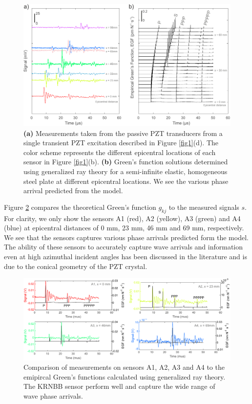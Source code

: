 \documentclass[preprint,3p, 11pt,authoryear]{elsarticle}
\begin{document}
{\begin{figure}[ht]
     	\centering
\includegraphics[scale= 1.0]{FIG3.pdf} 
\caption{\textbf{(a)} Measurements taken from the passive PZT transducers from a single transient PZT excitation described in Figure \ref{fig1}(d). The color scheme represents the different epicentral locations of each sensor in Figure \ref{fig1}(b).  \textbf{(b)} Green's function solutions determined using generalized ray theory for a semi-infinite elastic, homogeneous steel plate at different epicentral locations.  We see the various phase arrival predicted from the model.}
	\label{fig3} 
\end{figure}

Figure \ref{fig4} compares the theoretical Green's function $g_{kj}$ to the measured signals $s$.  For clarity, we only show the sensors A1 (red), A2 (yellow), A3 (green) and A4 (blue) at epicentral distances of 0 mm, 23 mm, 46 mm and 69 mm, respectively. We see that the sensors captures various phase arrivals predicted form the model. The ability of these sensors to accurately capture wave arrivals and information even at high azimuthal incident angles has been discussed in the literature \citep{Goodfellow2015, Selvadurai2019} and is due to the conical geometry of the PZT crystal. 


\begin{figure}[ht]
     	\centering
\includegraphics[scale= 0.90]{FIG4.pdf} 
\caption{Comparison of measurements on sensors A1, A2, A3 and A4 to the emipircal Green's functions calculated using generalized ray theory. The KRNBB sensor perform well and capture the wide range of wave phase arrivals.}
	\label{fig4} 
\end{figure}

}
\end{document}
